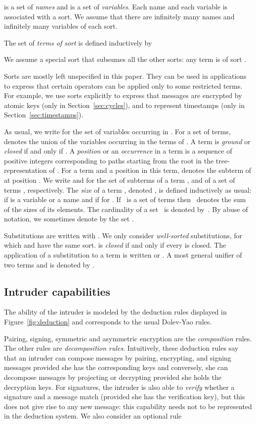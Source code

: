 \documentclass[acmtocl,acmnow]{acmtrans2m}
\begin{document}
  is a set of \emph{names} and  is
a set of \emph{variables}. Each name and each variable is associated with 
a sort. We assume that there are infinitely many names and infinitely
many variables of each sort.


The set of
\emph{terms of sort } is defined inductively by


We assume a special sort  that
subsumes all the other sorts: any term is of sort .

Sorts are mostly left unspecified in this paper. They can be used in
applications to express that certain operators can be applied only
to some restricted terms.
For example, we use sorts explicitly to express that messages are encrypted by atomic keys (only in Section~\ref{sec:cycles}),
and to represent timestamps (only in Section~\ref{sec:timestamps}).


As usual, we write  for the set of variables occurring in . For a  set  of terms,  denotes the union of the variables occurring in the terms of .
A term  is \emph{ground} or \emph{closed} if and only if .
A \emph{position} or an \emph{occurrence} in a term  is a sequence of positive integers corresponding
to paths starting from the root in the tree-representation of .
For a term  and a position  in this term,  denotes the  subterm of  at
position .
We write  and  for the set of subterms of a term ,
and of a set of terms , respectively.  The \emph{size} of a term
, denoted , is defined inductively as usual:  if  is
a variable or a name and  if
 for .  If~ is a set of terms
then~ denotes the sum of the sizes of its elements. The
cardinality of a set~ is denoted by~. By abuse of
notation, we sometimes denote by  the set .


Substitutions are written  with . We only consider \emph{well-sorted} substitutions, 
for which  and  have the same sort.  is \emph{closed} if and only if every  is
closed.
The application of a substitution  to a term  is written  or .
A {most general unifier} of two terms  and  is denoted by .





\subsection{Intruder capabilities}
The ability of the intruder is modeled by the deduction rules
displayed in Figure~\ref{fig:deduction} and corresponds to the usual
Dolev-Yao rules. 

Pairing, signing, symmetric and asymmetric encryption are the \emph{composition}
rules. The other rules are \emph{decomposition rules}.
Intuitively, these deduction rules say that an intruder can compose
messages by pairing, encrypting, and signing messages provided she has
the corresponding keys and conversely, she can decompose messages by
projecting or decrypting provided she holds the decryption keys. For
signatures, the intruder is also able to \emph{verify} whether a
signature  and a message  match (provided she has the
verification key), but this does not give rise to any new message: 
 this capability needs not to be represented in the deduction system.
We also consider an optional rule
\end{document}

